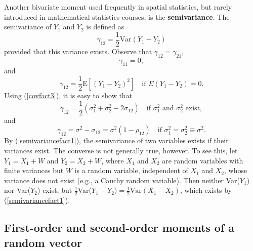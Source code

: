 Another bivariate moment used frequently in spatial statistics, but rarely introduced in mathematical statistics courses, is the {\bf semivariance}.  The semivariance of $Y_1$ and $Y_2$ is defined as
\[ \gamma_{12}=\frac{1}{2}\mbox{Var}(Y_1-Y_2) \]
provided that this variance exists.  Observe that $\gamma_{12}=\gamma_{21}$, 
\begin{equation}\label{semivariance0}
\gamma_{11}=0,
\end{equation}
and
\begin{equation}\label{altsemivariance}
\gamma_{12} = \frac{1}{2}\mbox{E}[(Y_1-Y_2)^2]\quad\mbox{if $E(Y_1-Y_2)=0$.}
\end{equation}
Using (\ref{covfact3}), it is easy to show that
\begin{equation}\label{semivariancefact1}
\gamma_{12} = \frac{1}{2}(\sigma_1^2+\sigma_2^2-2\sigma_{12})\quad\mbox{if $\sigma_1^2$ and $\sigma_2^2$ exist}, 
\end{equation}
and
\begin{equation}\label{semivariancefact2}
\gamma_{12} = \sigma^2-\sigma_{12}=\sigma^2(1-\rho_{12})\quad\mbox{if $\sigma_1^2=\sigma_2^2\equiv\sigma^2$}.
\end{equation}
By (\ref{semivariancefact1}), the semivariance of two variables exists if their variances exist.  The converse is not generally true, however.  To see this, let $Y_1=X_1+W$ and $Y_2=X_2+W$, where $X_1$ and $X_2$ are random variables with finite variances but $W$ is a random variable, independent of $X_1$ and $X_2$, whose variance does not exist (e.g., a Cauchy random variable).  Then neither Var($Y_1$) nor Var($Y_2$) exist, but $\frac{1}{2}$Var($Y_1-Y_2)=\frac{1}{2}\mbox{Var}(X_1-X_2)$, which exists by (\ref{semivariancefact1}).


\subsection{First-order and second-order moments of a random vector}


